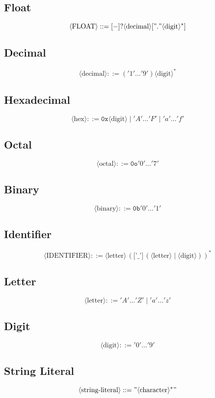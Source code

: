 \documentclass{article}
\begin{document}
\subsection{Float}
\[
\langle \text{FLOAT} \rangle ::= [-]? \langle \text{decimal} \rangle [ "." \langle \text{digit} \rangle^*]
\]

\subsection{Decimal}
\[
\langle \text{decimal} \rangle ::= ( '1' \dots '9' ) \langle \text{digit} \rangle^*
\]

\subsection{Hexadecimal}
\[
\langle \text{hex} \rangle ::= \texttt{0x} \langle \text{digit} \rangle \mid 'A' \dots 'F' \mid 'a' \dots 'f'
\]

\subsection{Octal}
\[
\langle \text{octal} \rangle ::= \texttt{0o} '0' \dots '7'
\]

\subsection{Binary}
\[
\langle \text{binary} \rangle ::= \texttt{0b} '0' \dots '1'
\]
\subsection{Identifier}
\[
\langle \text{IDENTIFIER} \rangle ::= \langle \text{letter} \rangle \, ( \texttt{['\_']} \, ( \langle \text{letter} \rangle \mid \langle \text{digit} \rangle ) )^*
\]

\subsection{Letter}
\[
\langle \text{letter} \rangle ::= 'A' \dots 'Z' \mid 'a' \dots 'z'
\]

\subsection{Digit}
\[
\langle \text{digit} \rangle ::= '0' \dots '9'
\]

\subsection{String Literal}
\[
\langle \text{string-literal} \rangle ::= " \langle \text{character} \rangle^* "
\]
\end{document}
